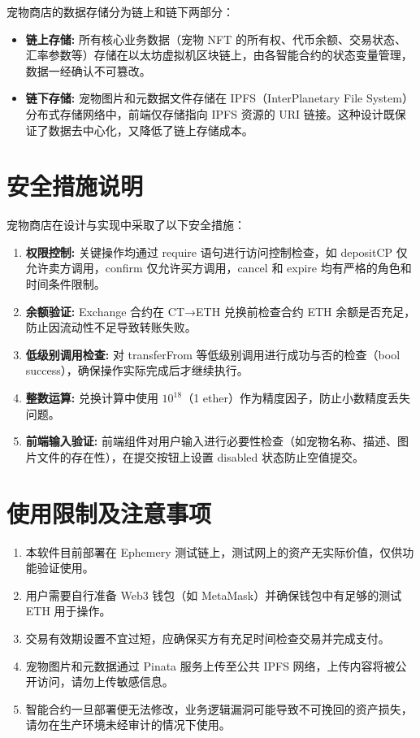 \documentclass{mancls}
\begin{document}
宠物商店的数据存储分为链上和链下两部分：

\begin{itemize}
	\item \textbf{链上存储:} 所有核心业务数据（宠物 NFT 的所有权、代币余额、交易状态、汇率参数等）存储在以太坊虚拟机区块链上，由各智能合约的状态变量管理，数据一经确认不可篡改。
	\item \textbf{链下存储:} 宠物图片和元数据文件存储在 IPFS（InterPlanetary File System）分布式存储网络中，前端仅存储指向 IPFS 资源的 URI 链接。这种设计既保证了数据去中心化，又降低了链上存储成本。
\end{itemize}

\section{安全措施说明}

宠物商店在设计与实现中采取了以下安全措施：

\begin{enumerate}
	\item \textbf{权限控制:} 关键操作均通过 require 语句进行访问控制检查，如 depositCP 仅允许卖方调用，confirm 仅允许买方调用，cancel 和 expire 均有严格的角色和时间条件限制。
	\item \textbf{余额验证:} Exchange 合约在 CT→ETH 兑换前检查合约 ETH 余额是否充足，防止因流动性不足导致转账失败。
	\item \textbf{低级别调用检查:} 对 transferFrom 等低级别调用进行成功与否的检查（bool success），确保操作实际完成后才继续执行。
	\item \textbf{整数运算:} 兑换计算中使用 $10^{18}$（1 ether）作为精度因子，防止小数精度丢失问题。
	\item \textbf{前端输入验证:} 前端组件对用户输入进行必要性检查（如宠物名称、描述、图片文件的存在性），在提交按钮上设置 disabled 状态防止空值提交。
\end{enumerate}

\section{使用限制及注意事项}

\begin{enumerate}
	\item 本软件目前部署在 Ephemery 测试链上，测试网上的资产无实际价值，仅供功能验证使用。
	\item 用户需要自行准备 Web3 钱包（如 MetaMask）并确保钱包中有足够的测试 ETH 用于操作。
	\item 交易有效期设置不宜过短，应确保买方有充足时间检查交易并完成支付。
	\item 宠物图片和元数据通过 Pinata 服务上传至公共 IPFS 网络，上传内容将被公开访问，请勿上传敏感信息。
	\item 智能合约一旦部署便无法修改，业务逻辑漏洞可能导致不可挽回的资产损失，请勿在生产环境未经审计的情况下使用。
\end{enumerate}
\end{document}
